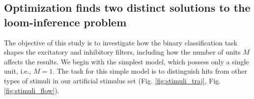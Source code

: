 \documentclass[pdftex,9pt,lineno]{elife}
\begin{document}
\begin{figure}
\label{figsupp:sf1}
\end{figure}


\subsection{Optimization finds two distinct solutions to the loom-inference problem}

The objective of this study is to investigate how the binary classification task shapes the excitatory and inhibitory filters, including how the number of units $M$ affects the results. We begin with the simplest model, which possess only a single unit, i.e., $M=1$. The task for this simple model is to distinguish hits from other types of stimuli in our artificial stimulus set (Fig. \ref{fig:stimuli_traj}, Fig. \ref{fig:stimuli_flow}).
\end{document}

